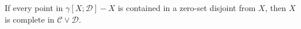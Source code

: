 If every point in $\gamma[X; \mathcal{D}] - X$ is contained in a zero-set disjoint from $X$, then $X$ is complete in $\mathcal{C} \vee \mathcal{D}$.
